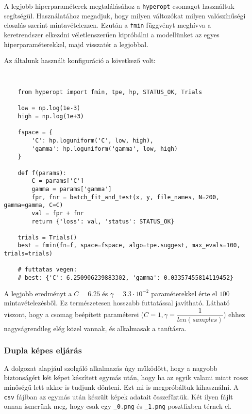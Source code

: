 A legjobb hiperparaméterek megtalálásához a \texttt{hyperopt} \cite{hyperopt} csomagot használtuk
segítségül. Használatához megadjuk, hogy milyen változókat milyen valószínűségi eloszlás szerint
mintavételezzen. Ezután a \texttt{fmin} függvényt meghívva a keretrendszer elkezdni véletlenszerűen
kipróbálni a modellünket az egyes hiperparaméterekkel, majd visszatér a legjobbal. 

Az általunk használt konfiguráció a következő volt:
\begin{lstlisting}


	from hyperopt import fmin, tpe, hp, STATUS_OK, Trials
	
	low = np.log(1e-3)
	high = np.log(1e+3)
	
	fspace = {	
		'C': hp.loguniform('C', low, high),
		'gamma': hp.loguniform('gamma', low, high)
	}
	
	def f(params):
		C = params['C']
		gamma = params['gamma']
		fpr, fnr = batch_fit_and_test(x, y, file_names, N=200, gamma=gamma, C=C)
		val = fpr + fnr
		return {'loss': val, 'status': STATUS_OK}
	
	trials = Trials()
	best = fmin(fn=f, space=fspace, algo=tpe.suggest, max_evals=100, trials=trials)
	
	# futtatas vegen:
	# best: {'C': 6.250906239883302, 'gamma': 0.03357455814119452}
\end{lstlisting}


A legjobb eredményt a $ C=6.25 $ és $ \gamma = 3.3 \cdot 10^{-2} $ paraméterekkel érte el $ 100 $
mintavételezésből. Ez természetesen hosszabb futtatással javítható. Látható viszont, hogy a csomag
beépített paraméterei ($ C=1 , \gamma =\dfrac{1}{len(samples)} $) ehhez nagyságrendileg elég közel vannak,
és alkalmasak a tanításra.


\subsubsection{Dupla képes eljárás}

A dolgozat alapjául szolgáló alkalmazás úgy működött, hogy a nagyobb biztonságért két képet készített
egymás után, hogy ha az egyik valami miatt rossz minőségű lett akkor is tudjunk dönteni. Ezt 
mi is megpróbáltuk kihasználni. A \texttt{csv} fájlban az egymás után készült képek adatait
összefűztük. Két ilyen fájlt onnan ismerünk meg, hogy csak egy \texttt{\_0.png} és \texttt{\_1.png}
posztfixben térnek el.


%
%
%
%
%
%


